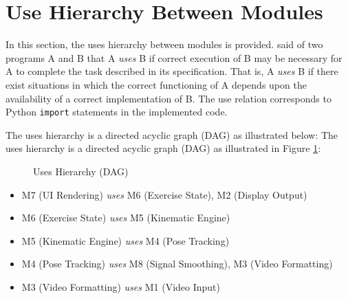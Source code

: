 \documentclass[12pt, titlepage]{article}
\begin{document}
\section{Use Hierarchy Between Modules} \label{SecUse}

In this section, the uses hierarchy between modules is
provided. \citet{Parnas1978} said of two programs A and B that A {\em uses} B if
correct execution of B may be necessary for A to complete the task described in
its specification. That is, A {\em uses} B if there exist situations in which
the correct functioning of A depends upon the availability of a correct
implementation of B. The use relation corresponds to Python \texttt{import}
statements in the implemented code.

The uses hierarchy is a directed acyclic graph (DAG) as illustrated below:
The uses hierarchy is a directed acyclic graph (DAG) as illustrated in Figure \ref{FigDAG}:

\begin{figure}[H]
\centering
{}
\caption{Uses Hierarchy (DAG)}
\label{FigDAG}
\end{figure}

\begin{itemize}
  \item M7 (UI Rendering) \emph{uses} M6 (Exercise State), M2 (Display Output)
  \item M6 (Exercise State) \emph{uses} M5 (Kinematic Engine)
  \item M5 (Kinematic Engine) \emph{uses} M4 (Pose Tracking)
  \item M4 (Pose Tracking) \emph{uses} M8 (Signal Smoothing), M3 (Video Formatting)
  \item M3 (Video Formatting) \emph{uses} M1 (Video Input)
\end{itemize}
\end{document}
